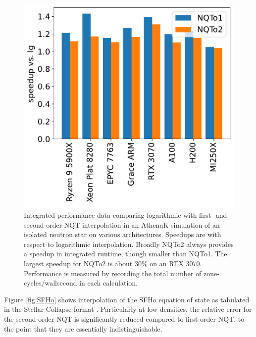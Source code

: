 \documentclass[linenumbers,twocolumn]{aastex631}
\begin{document}
\begin{nolinenumbers}
\begin{figure}[tb]
    \centering
    \includegraphics[width=0.99\columnwidth]{figures/athenak_speedups.pdf}
    \caption{Integrated performance data comparing logarithmic with first- and second-order NQT interpolation in an AthenaK simulation of an isolated neutron star on various architectures. Speedups are with respect to logarithmic interpolation. Broadly NQTo2 always provides a speedup in integrated runtime, though smaller than NQTo1. The largest speedup for NQTo2 is about 30\% on an RTX 3070. Performance is measured by recording the total number of zone-cycles/wallsecond in each calculation.}
    \label{fig:TOV:perf}
\end{figure}
\end{nolinenumbers}

Figure \ref{fig:SFHo} shows interpolation of the SFHo \citep{SFHoEOS} equation of state as tabulated in the Stellar Collapse format \cite{stellarcollapsetables}. Particularly at low densities, the relative error for the second-order NQT is significantly reduced compared to first-order NQT, to the point that they are essentially indistinguishable. 
\end{document}
